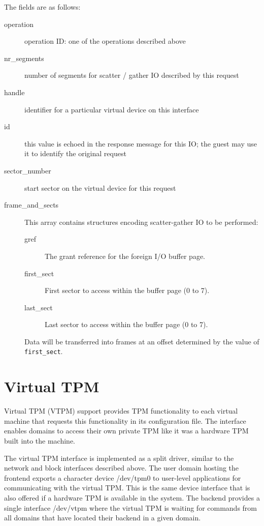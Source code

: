 \documentclass[11pt,twoside,final,openright,a4paper]{report}
\begin{document}
The fields are as follows:

\begin{description}
\item[operation] operation ID: one of the operations described above
\item[nr\_segments] number of segments for scatter / gather IO
  described by this request
\item[handle] identifier for a particular virtual device on this
  interface
\item[id] this value is echoed in the response message for this IO;
  the guest may use it to identify the original request
\item[sector\_number] start sector on the virtual device for this
  request
\item[frame\_and\_sects] This array contains structures encoding
  scatter-gather IO to be performed:
  \begin{description}
  \item[gref] The grant reference for the foreign I/O buffer page.
  \item[first\_sect] First sector to access within the buffer page (0 to 7).
  \item[last\_sect] Last sector to access within the buffer page (0 to 7).
  \end{description}
  Data will be transferred into frames at an offset determined by the
  value of {\tt first\_sect}.
\end{description}

\section{Virtual TPM}

Virtual TPM (VTPM) support provides TPM functionality to each virtual
machine that requests this functionality in its configuration file.
The interface enables domains to access their own private TPM like it
was a hardware TPM built into the machine.

The virtual TPM interface is implemented as a split driver,
similar to the network and block interfaces described above.
The user domain hosting the frontend exports a character device /dev/tpm0
to user-level applications for communicating with the virtual TPM.
This is the same device interface that is also offered if a hardware TPM
is available in the system. The backend provides a single interface
/dev/vtpm where the virtual TPM is waiting for commands from all domains
that have located their backend in a given domain.
\end{document}
